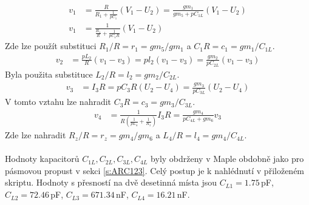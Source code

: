 \begin{align}
v_1 &= \frac{R}{R_1 + \frac{1}{pC_1}}(V_1 - U_2) = \frac{gm_1}{gm_5 + pC_{1L}}(V_1 - U_2)\\
v_1 &= \frac{1}{\frac{R_1}{R} + \frac{1}{pC_1R}}(V_1 - U_2)
\end{align}
Zde lze použít substituci $R_1/R = r_1 = gm_5/gm_1$ a $C_1R = c_1 = gm_1/C_{1L}$.
\begin{align}
v_2 &= \frac{pL_2}{R}(v_1 - v_3) = pl_2(v_1 - v_3) = \frac{gm_2}{pC_{2L}}(v_1 - v_3)
\end{align}
Byla použita substituce $L_2/R = l_2 = gm_2/C_{2L}$.
\begin{align}
v_3 &= I_3R = pC_3R(U_2 - U_4) = \frac{gm_3}{pC_{3L}}(U_2 - U_4)
\end{align}
V tomto vztahu lze nahradit $C_3R = c_3 = gm_3/C_{3L}$.
\begin{align}
v_4 &= \frac{1}{R(\frac{1}{pL_4} + \frac{1}{R_z})}I_3R = \frac{gm_4}{pC_{4L} + gm_6}v_3
\end{align}
Zde lze nahradit $R_z/R = r_z = gm_4/gm_6$ a $L_4/R = l_4 = gm_4/C_{4L}$.\\
\\
Hodnoty kapacitorů $C_{1L}, C_{2L}, C_{3L}, C_{4L}$ byly obdrženy v Maple obdobně jako pro pásmovou propust v sekci \ref{s:ARC123}. Celý postup je k nahlédnutí v přiloženém skriptu. Hodnoty s přesností na dvě desetinná místa jsou $C_{L1} = 1.75$\,pF, $C_{L2} = 72.46$\,pF, $C_{L3} = 671.34$\,nF, $C_{L4} = 16.21$\,nF.
